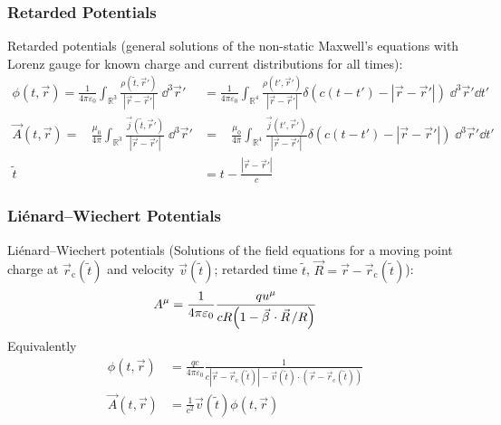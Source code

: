 		\subsubsection{Retarded Potentials}
			\label{Sec:RetardedPotentials}
			\noindent
			Retarded potentials (general solutions of the non-static Maxwell's equations with Lorenz gauge for known charge and current distributions for all times):
			\begin{equation}
				\begin{aligned}
					\phi\left(t,\vec{r}\right)
					= \frac{1}{4\pi\varepsilon_0} \int_{\mathbb{R}^3} \frac{\rho(\tilde{t},\vec{r}')}{\left|\vec{r}-\vec{r}'\right|}\;\dd^3 \vec{r}'
					&=	\frac{1}{4\pi\varepsilon_0} \int_{\mathbb{R}^4} \frac{\rho(t',\vec{r}')}{\left|\vec{r}-\vec{r}'\right|}\delta\left( c(t-t')-\left|\vec{r}-\vec{r}'\right|\right)\;\dd^3 \vec{r}'\dd t' \\
					\vec{A}\left(t,\vec{r}\right)
					= \phantom{\varepsilon_0} \frac{\mu_0}{4\pi} \int_{\mathbb{R}^3} \frac{\vec{j}(\tilde{t},\vec{r}')}{\left|\vec{r}-\vec{r}'\right|}\;\dd^3 \vec{r}'
					&=	\phantom{\varepsilon_0} \frac{\mu_0}{4\pi} \int_{\mathbb{R}^4} \frac{\vec{j}(t',\vec{r}')}{\left|\vec{r}-\vec{r}'\right|}\delta\left( c(t-t')-\left|\vec{r}-\vec{r}'\right|\right)\;\dd^3 \vec{r}'\dd t' \\
					\tilde{t}&=t-\frac{\left|\vec{r}-\vec{r}'\right|}{c}
				\end{aligned}
			\end{equation}

		\subsubsection{Liénard--Wiechert Potentials}
			\noindent
			Liénard--Wiechert potentials (Solutions of the field equations for a moving point charge at $\vec{r}_\text{c}(\tilde{t})$ and velocity $\vec{v}(\tilde{t})$; retarded time $\tilde{t}$, $\vec{R}= \vec{r}-\vec{r}_\text{c}(\tilde{t})$):
			\begin{equation}
				A^\mu = \frac{1}{4\pi\varepsilon_0} \frac{q u^\mu}{c R \qty(1 - \vec{\beta}\cdot\vec{R}/R) }
			\end{equation}
			Equivalently
			\begin{equation}
				\begin{aligned}
					\phi(t,\vec{r}) & =\frac{q c}{4\pi \varepsilon_0}\frac{1}{c \left|\vec{r}-\vec{r}_\text{c}(\tilde{t})\right|-\vec{v}(\tilde{t})\cdot\left(\vec{r}-\vec{r}_\text{c}(\tilde{t})\right)} \\
					\vec{A}(t,\vec{r}) &= \frac{1}{c^2}\vec{v}(\tilde{t})\phi(t,\vec{r}) \\
				\end{aligned}
			\end{equation}

